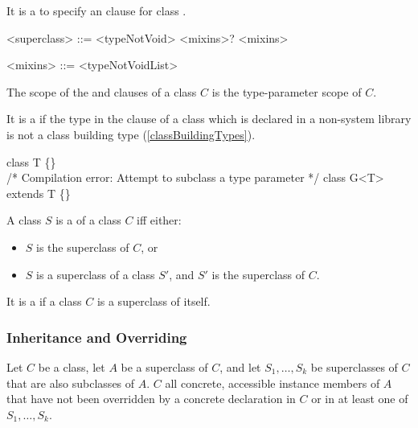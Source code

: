 \documentclass[makeidx]{article}
\begin{document}
\LMHash{}%
It is a  to specify an \EXTENDS{} clause
for class .

\begin{grammar}
<superclass> ::= \EXTENDS{} <typeNotVoid> <mixins>?
    \alt <mixins>

<mixins> ::= \WITH{} <typeNotVoidList>
\end{grammar}

\LMHash{}%
The scope of the \EXTENDS{} and \WITH{} clauses of a class $C$ is
the type-parameter scope of $C$.

\LMHash{}%
It is a  if the type
in the \EXTENDS{} clause of a class
which is declared in a non-system library
is not a class building type
(\ref{classBuildingTypes}).


\begin{dartCode}
class T \{\}
\\
/* Compilation error: Attempt to subclass a type parameter */
class G<T> extends T \{\}
\end{dartCode}

\LMHash{}%
A class $S$ is a  of a class $C$ if{}f either:
\begin{itemize}
\item $S$ is the superclass of $C$, or
\item $S$ is a superclass of a class $S'$,
  and $S'$ is the superclass of $C$.
\end{itemize}

\LMHash{}%
It is a  if a class $C$ is a superclass of itself.


\subsubsection{Inheritance and Overriding}

\LMHash{}%
Let $C$ be a class, let $A$ be a superclass of $C$, and
let $S_1, \ldots, S_k$ be superclasses of $C$ that are also subclasses of $A$.
$C$  all concrete, accessible instance members of $A$
that have not been overridden by a concrete declaration in $C$
or in at least one of $S_1, \ldots, S_k$.
\end{document}

